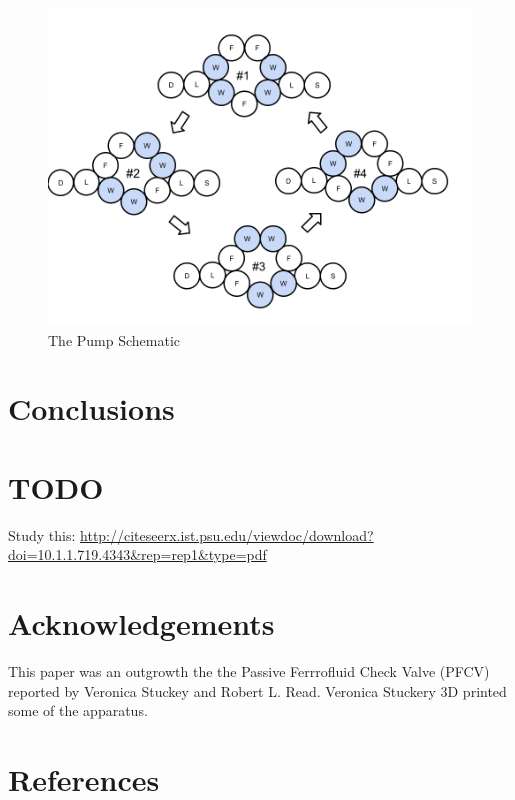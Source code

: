 \documentclass[12pt]{article}
\begin{document}
\begin{figure}
\centerline{\includegraphics[width=5in]{images/PumpPhases.png}}
\caption{The Pump Schematic}
\label{fig_pumpschematic}
\end{figure}


\section{Conclusions}

\section{TODO}

Study this: \url{http://citeseerx.ist.psu.edu/viewdoc/download?doi=10.1.1.719.4343&rep=rep1&type=pdf}

\section{Acknowledgements}

This paper was an outgrowth the the Passive Ferrrofluid Check Valve (PFCV) \cite{stuckeynovel}
reported by Veronica Stuckey and Robert L. Read. Veronica Stuckery 3D printed
some of the apparatus.

\section*{References}



\end{document}
